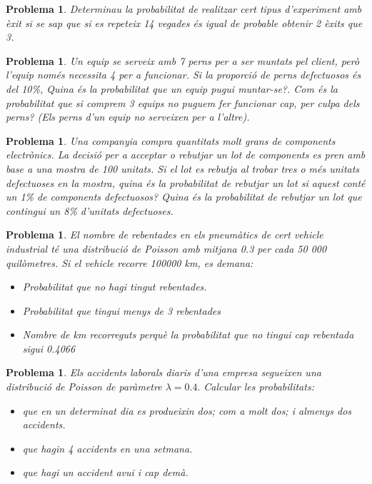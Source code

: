 \documentclass[11pt]{article}
\newcounter{prbcont}
\newtheorem{problema}[prbcont]{Problema}
\newcommand{\sol}[1]{{\textbf{\footnotetext[\the\problemes]{Sol.: #1} }}}
\begin{document}
\begin{problema}
Determinau la probabilitat de realitzar cert tipus d'experiment amb \`exit si se sap que si es repeteix 14 vegades \'es igual de probable obtenir 2 \`exits que 3.%
\end{problema}

\begin{problema}
Un equip se serveix amb 7 perns per a ser muntats pel client, per\`o l'equip nom\'es necessita 4 per a funcionar. Si la proporci\'o de perns defectuosos \'es del 10\%, Quina \'es la probabilitat que un equip pugui muntar-se?. Com \'es la probabilitat que si comprem 3 equips no puguem fer funcionar cap, per culpa dels perns? (Els perns d'un equip no serveixen per a l'altre).%
\end{problema}

\begin{problema}
Una companyia compra quantitats molt grans de components electr\`onics. La decisi\'o per a acceptar o rebutjar un lot de components es pren amb base a una mostra de 100 unitats. Si el lot es rebutja al trobar tres o m\'es unitats defectuoses en la mostra, quina \'es la probabilitat de rebutjar un lot si aquest cont\'e un 1\% de components defectuosos? Quina \'es la probabilitat de rebutjar un lot que contingui un 8\% d'unitats defectuoses. %
\end{problema}



\begin{problema}
El nombre de rebentades en els pneum\`atics de cert vehicle industrial t\'e una distribuci\'o de Poisson amb mitjana 0.3 per cada 50 000 quil\`ometres. Si el vehicle recorre 100000 km, es demana: 
\begin{itemize}
\item Probabilitat que no hagi tingut rebentades. 
\item Probabilitat que tingui menys de 3 rebentades 
\item Nombre de km recorreguts perqu\`e la probabilitat que no tingui cap rebentada sigui 0.4066 
\end{itemize}%
\end{problema}

\begin{problema}
Els accidents laborals diaris d'una empresa segueixen una distribuci\'o de Poisson de par\`ametre $\lambda=0.4.$ Calcular les probabilitats: 
\begin{itemize}
\item que en un determinat dia es produeixin dos; com a molt dos; i almenys dos accidents. 
\item que hagin 4 accidents en una setmana. 
\item que hagi un accident avui i cap dem\`a. 
\end{itemize}%
\end{problema}
\end{document}
